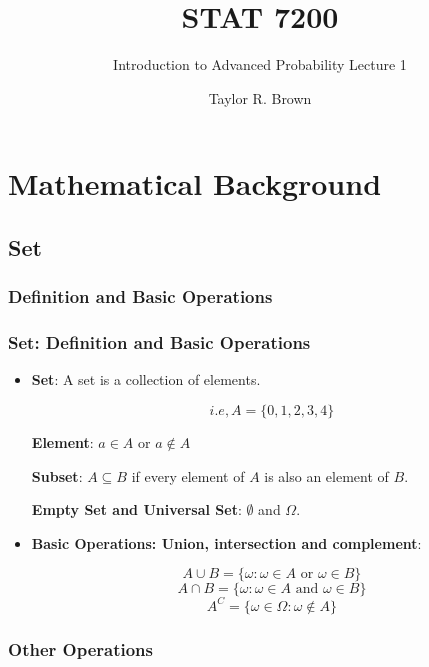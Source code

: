 \documentclass[handout]{beamer}
\title{STAT 7200}
\subtitle{Introduction to Advanced Probability \newline Lecture 1}
\author{Taylor R. Brown}
\institute{}
\date{}
\begin{document}
\frame{\titlepage}

\section[Outline]{}




\section{Mathematical Background}
\subsection{Set}

\subsubsection{Definition and Basic Operations}
\frame
{
  \frametitle{Set: Definition and Basic Operations}

\begin{itemize}
\item<1->
\textbf{Set}: A set is a collection of elements.

$$i.e, A=\{0,1,2,3,4\}$$

\textbf{Element}: $a\in A$ or $a \not\in A$

\textbf{Subset}: $A \subseteq B$ if every element of $A$ is also an element of $B$.

\textbf{Empty Set and Universal Set}: $\emptyset$ and $\Omega$.
\newline

\item<2->  \textbf{Basic Operations: Union, intersection and complement}: 

$$A\cup B=\{\omega: \omega\in A \text{ or } \omega \in B\}$$
$$ A\cap B=\{\omega: \omega\in A \text{ and } \omega\in B\}$$
$$ A^C=\{\omega\in \Omega: \omega \not \in A\}$$

\end{itemize}

}

\subsubsection{Other Operations}
\end{document}
